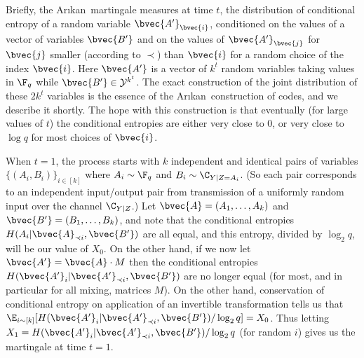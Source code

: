 \documentclass[11pt]{article}
\newcommand{\Arikan}{Ar\i kan}
\begin{document}
Briefly, the \Arikan~martingale measures at time $t$, the distribution of conditional entropy of a random variable $\bvec{A'}_{\bvec{i}}$, conditioned on the values of a vector of variables $\bvec{B'}$ and on the values of $\bvec{A'}_{\bvec{j}}$ for $\bvec{j}$ smaller (according to $\prec$) than $\bvec{i}$ for a random choice of the index $\bvec{i}$. Here $\bvec{A'}$ is a vector of $k^t$ random variables taking values in $\F_q$ while
$\bvec{B'} \in \mathcal{Y}^{k^t}$.
The exact construction of the joint distribution of these $2k^t$ variables is the essence of the \Arikan\ construction of codes, and we describe it shortly. The hope with this construction is  that eventually (for large values of $t$) the conditional entropies are either very close to $0$, or very close to $\log q$ for most choices of $\bvec{i}$.

When $t=1$, the process starts with $k$ independent and identical pairs of variables
$\{(A_i,B_i)\}_{i\in [k]}$ where $A_i \sim \F_q$ and $B_i \sim \C_{Y|Z=A_i}$. (So each pair corresponds to an independent input/output pair from transmission of a uniformly random input over the channel $\C_{Y|Z}$.) Let $\bvec{A} = (A_1,\ldots,A_k)$ and $\bvec{B'} = (B_1,\ldots,B_k)$, and note that the conditional entropies $H(A_i | \bvec{A}_{\prec i},\bvec{B'})$ are all equal, and this entropy, divided by $\log_2 q$, will be our value of $X_0$. On the other hand, if we now let
$\bvec{A'} = \bvec{A}\cdot M$ then the conditional entropies $H(\bvec{A'}_i | \bvec{A'}_{\prec i},\bvec{B'})$ are no longer equal (for most, and in particular for all mixing, matrices $M$). On the other hand, conservation of conditional entropy on application of an invertible transformation tells us that $\E_{i \sim [k]}[ H(\bvec{A'}_i | \bvec{A'}_{\prec i},\bvec{B'})/\log_2 q ] = X_0$. Thus letting $X_1 =
H(\bvec{A'}_i | \bvec{A'}_{\prec i},\bvec{B'})/\log_2 q$ (for random $i$) gives us the martingale at time $t=1$.
\end{document}
